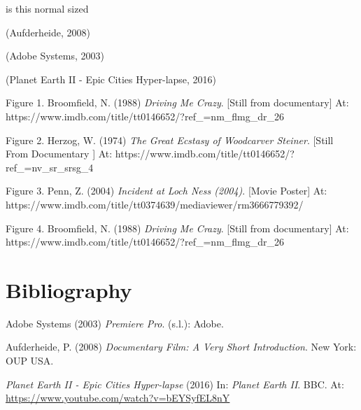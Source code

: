 \documentclass[
  12pt,
]{book}
\newlength{\cslhangindent}
\newlength{\cslentryspacingunit} %
\newenvironment{CSLReferences}[2] %
 {%
  \setlength{\parindent}{0pt}
  \ifodd #1
  \let\oldpar\par
  \def\par{\hangindent=\cslhangindent\oldpar}
  \fi
  \setlength{\parskip}{#2\cslentryspacingunit}
 }%
 {}
\begin{document}
{\normalsize is this normal sized}
\vspace{20pt}

(Aufderheide, 2008)

(Adobe Systems, 2003)

(Planet Earth II - Epic Cities Hyper-lapse, 2016)

\pagebreak

\listoffigures

\left\lbrace 
{\normalsize
Figure 1. Broomfield, N. (1988) \emph{Driving Me Crazy}. {[}Still from documentary{]} At: https://www.imdb.com/title/tt0146652/?ref\_=nm\_flmg\_dr\_26

Figure 2. Herzog, W. (1974) \emph{The Great Ecstasy of Woodcarver Steiner}. {[}Still From Documentary {]} At: https://www.imdb.com/title/tt0146652/?ref\_=nv\_sr\_srsg\_4

Figure 3. Penn, Z. (2004) \emph{Incident at Loch Ness (2004)}. {[}Movie Poster{]} At: https://www.imdb.com/title/tt0374639/mediaviewer/rm3666779392/

Figure 4. Broomfield, N. (1988) \emph{Driving Me Crazy}. {[}Still from documentary{]} At: https://www.imdb.com/title/tt0146652/?ref\_=nm\_flmg\_dr\_26}

\hypertarget{bibliography}{%
\chapter*{Bibliography}\label{bibliography}}

\hypertarget{refs}{}
\begin{CSLReferences}{0}{0}
\leavevmode{}%
Adobe Systems (2003) \emph{Premiere Pro}. (s.l.): Adobe.

\leavevmode{}%
Aufderheide, P. (2008) \emph{Documentary Film: A Very Short Introduction}. New York: OUP USA.

\leavevmode{}%
\emph{Planet Earth II - Epic Cities Hyper-lapse} (2016) In: \emph{Planet Earth II}. BBC. At: \url{https://www.youtube.com/watch?v=bEYSyfEL8nY}

\end{CSLReferences}

\backmatter
\end{document}
